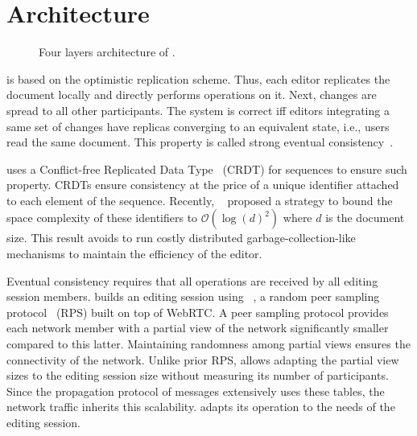 
\section{Architecture}
\label{sec:architecture}

\begin{figure}
  \centering
  
  \caption{\label{fig:architecture} Four layers architecture of \CRATE.}
\end{figure}

\CRATE is based on the optimistic replication scheme. Thus, each editor
replicates the document locally and directly performs operations on it. Next,
changes are spread to all other participants. The system is correct iff editors
integrating a same set of changes have replicas converging to an equivalent
state, i.e., users read the same document.  This property is called strong
eventual consistency~\cite{shapiro2011comprehensive}.

\CRATE uses a Conflict-free Replicated Data Type~\cite{shapiro2011comprehensive}
(CRDT) for sequences to ensure such property. CRDTs ensure consistency at the
price of a unique identifier attached to each element of the sequence. Recently,
\LSEQ~\cite{nedelec2013lseq} proposed a strategy to bound the space complexity
of these identifiers to $\mathcal{O}(\log(d)^2)$ where $d$ is the document
size. This result avoids to run costly distributed garbage-collection-like
mechanisms to maintain the efficiency of the editor.

Eventual consistency requires that all operations are received by all editing
session members.  \CRATE builds an editing session using
\SPRAY~\cite{nedelec2015spray}, a random peer sampling
protocol~\cite{jelasity2007gossip} (RPS) built on top of WebRTC. A peer sampling
protocol provides each network member with a partial view of the network
significantly smaller compared to this latter. Maintaining randomness among
partial views ensures the connectivity of the network. Unlike prior RPS, \SPRAY
allows adapting the partial view sizes to the editing session size without
measuring its number of participants. Since the propagation protocol of messages
extensively uses these tables, the network traffic inherits this scalability.
\CRATE adapts its operation to the needs of the editing session.


